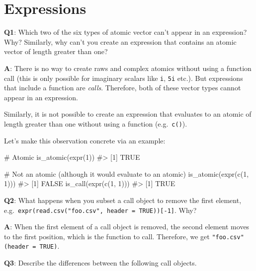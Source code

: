 \documentclass[
]{krantz}
\makeatletter
\newenvironment{Shaded}{\begin{snugshade}}{\end{snugshade}}
\newcommand{\CommentTok}[1]{\textcolor[rgb]{0.56,0.35,0.01}{\textit{#1}}}
\newcommand{\DecValTok}[1]{\textcolor[rgb]{0.00,0.00,0.81}{#1}}
\newcommand{\KeywordTok}[1]{\textcolor[rgb]{0.13,0.29,0.53}{\textbf{#1}}}
\newcommand{\NormalTok}[1]{#1}
\newenvironment{kframe}{%
\medskip{}
\setlength{\fboxsep}{.8em}
 \def\at@end@of@kframe{}%
 \ifinner\ifhmode%
  \def\at@end@of@kframe{\end{minipage}}%
  \begin{minipage}{\columnwidth}%
 \fi\fi%
 \def\FrameCommand##1{\hskip\@totalleftmargin \hskip-\fboxsep
 \colorbox{shadecolor}{##1}\hskip-\fboxsep
     \hskip-\linewidth \hskip-\@totalleftmargin \hskip\columnwidth}%
 \MakeFramed {\advance\hsize-\width
   \@totalleftmargin\z@ \linewidth\hsize
   \@setminipage}}%
 {\par\unskip\endMakeFramed%
 \at@end@of@kframe}
\renewenvironment{Shaded}{\begin{kframe}}{\end{kframe}}
\renewcommand{\KeywordTok} [1]{\textcolor[rgb]{0.00,0.44,0.13}{{#1}}}
\renewcommand{\DecValTok}  [1]{\textcolor[rgb]{0.25,0.63,0.44}{{#1}}}
\renewcommand{\CommentTok} [1]{\textcolor[rgb]{0.38,0.63,0.69}{{#1}}}
\renewcommand{\NormalTok}  [1]{{#1}}
\makeatother
\begin{document}
\hypertarget{expressions-1}{%
\section{Expressions}\label{expressions-1}}

\textbf{{Q1}}: Which two of the six types of atomic vector can't appear in an expression? Why? Similarly, why can't you create an expression that contains an atomic vector of length greater than one?

\textbf{{A}}: There is no way to create raws and complex atomics without using a function call (this is only possible for imaginary scalars like \texttt{i}, \texttt{5i} etc.). But expressions that include a function are \emph{calls}. Therefore, both of these vector types cannot appear in an expression.

Similarly, it is not possible to create an expression that evaluates to an atomic of length greater than one without using a function (e.g.~\texttt{c()}).

Let's make this observation concrete via an example:

\begin{Shaded}
\begin{Highlighting}[]
\CommentTok{# Atomic}
\KeywordTok{is_atomic}\NormalTok{(}\KeywordTok{expr}\NormalTok{(}\DecValTok{1}\NormalTok{))}
\CommentTok{#> [1] TRUE}

\CommentTok{# Not an atomic (although it would evaluate to an atomic)}
\KeywordTok{is_atomic}\NormalTok{(}\KeywordTok{expr}\NormalTok{(}\KeywordTok{c}\NormalTok{(}\DecValTok{1}\NormalTok{, }\DecValTok{1}\NormalTok{)))}
\CommentTok{#> [1] FALSE}
\KeywordTok{is_call}\NormalTok{(}\KeywordTok{expr}\NormalTok{(}\KeywordTok{c}\NormalTok{(}\DecValTok{1}\NormalTok{, }\DecValTok{1}\NormalTok{)))}
\CommentTok{#> [1] TRUE}
\end{Highlighting}
\end{Shaded}

\textbf{{Q2}}: What happens when you subset a call object to remove the first element, e.g.~\texttt{expr(read.csv("foo.csv",\ header\ =\ TRUE)){[}-1{]}}. Why?

\textbf{{A}}: When the first element of a call object is removed, the second element moves to the first position, which is the function to call. Therefore, we get \texttt{"foo.csv"(header\ =\ TRUE)}.

\textbf{{Q3}}: Describe the differences between the following call objects.
\end{document}
